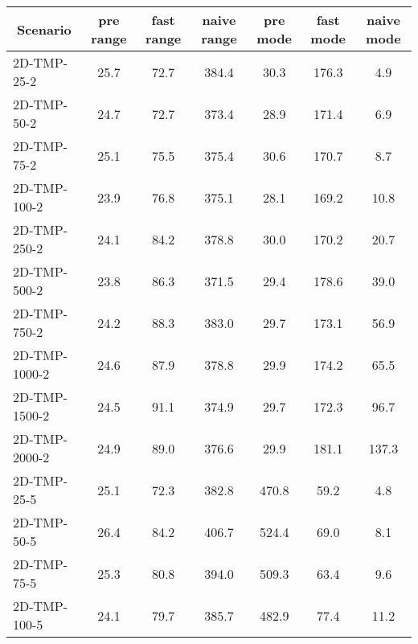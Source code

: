 \documentclass{article}
\begin{document}
\begin{center}
    \begin{table}[h]
        \begin{tabular}{|l||c|c|c|c|c|c|}
            \hline
            \multicolumn{1}{|c|}{Scenario} & pre range & fast range & naive range & pre mode & fast mode & naive mode \\
            \hline
            \hline
            2D-TMP-25-2                    & 25.7      & 72.7       & 384.4       & 30.3     & 176.3     & 4.9        \\
            2D-TMP-50-2                    & 24.7      & 72.7       & 373.4       & 28.9     & 171.4     & 6.9        \\
            2D-TMP-75-2                    & 25.1      & 75.5       & 375.4       & 30.6     & 170.7     & 8.7        \\
            2D-TMP-100-2                   & 23.9      & 76.8       & 375.1       & 28.1     & 169.2     & 10.8       \\
            2D-TMP-250-2                   & 24.1      & 84.2       & 378.8       & 30.0     & 170.2     & 20.7       \\
            2D-TMP-500-2                   & 23.8      & 86.3       & 371.5       & 29.4     & 178.6     & 39.0       \\
            2D-TMP-750-2                   & 24.2      & 88.3       & 383.0       & 29.7     & 173.1     & 56.9       \\
            2D-TMP-1000-2                  & 24.6      & 87.9       & 378.8       & 29.9     & 174.2     & 65.5       \\
            2D-TMP-1500-2                  & 24.5      & 91.1       & 374.9       & 29.7     & 172.3     & 96.7       \\
            2D-TMP-2000-2                  & 24.9      & 89.0       & 376.6       & 29.9     & 181.1     & 137.3      \\
            \hline
            2D-TMP-25-5                    & 25.1      & 72.3       & 382.8       & 470.8    & 59.2      & 4.8        \\
            2D-TMP-50-5                    & 26.4      & 84.2       & 406.7       & 524.4    & 69.0      & 8.1        \\
            2D-TMP-75-5                    & 25.3      & 80.8       & 394.0       & 509.3    & 63.4      & 9.6        \\
            2D-TMP-100-5                   & 24.1      & 79.7       & 385.7       & 482.9    & 77.4      & 11.2       \\

\end{tabular}
\end{table}
\end{center}
\end{document}
